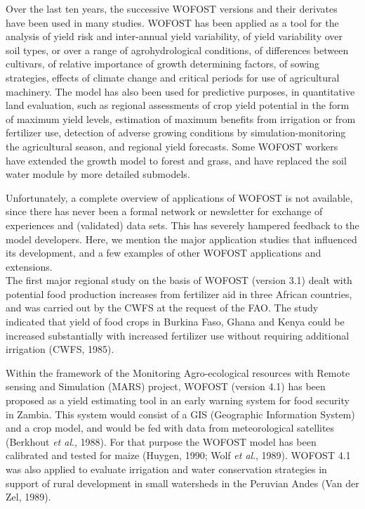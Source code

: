 \documentclass[11pt]{article}
\begin{document}
Over the last ten years, the successive WOFOST versions and their derivates have been
used in many studies. WOFOST has been applied as a tool for the analysis of yield risk
and inter-annual yield variability, of yield variability over soil types, or over a range of
agrohydrological conditions, of differences between cultivars, of relative importance of
growth determining factors, of sowing strategies, effects of climate change and critical
periods for use of agricultural machinery. The model has also been used for predictive
pur\-poses, in quantitative land evaluation, such as regional assessments of crop yield
potential in the form of maximum yield levels, estimation of maximum benefits from
irrigation or from fertilizer use, detection of adverse growing condi\-tions by simulation-monitoring the agricultural season, and regional yield forecasts. Some WOFOST workers
have extended the growth model to forest and grass, and have replaced the soil water
module by more detailed submodels.

Unfortunately, a complete overview of applications of WOFOST is not available, since
there has never been a formal network or newsletter for exchange of experiences and
(validat\-ed) data sets. This has severely hampered feedback to the model devel\-opers. Here,
we mention the major application studies that influenced its development, and a few
examples of other WOFOST applications and extensions.\\
 The first major regional study on the basis of WOFOST (version 3.1) dealt with potential
food production increases from fertilizer aid in three African countries, and was carried
out by the CWFS at the request of the FAO. The study indicated that yield of food crops
in Burkina Faso, Ghana and Kenya could be increased substantially with increased
fertilizer use without requiring additional irrigation (CWFS, 1985).

\bigskip
Within the framework of the Monitoring Agro-ecological {\nobreak}resources with Remote sensing
and Simulation (MARS) project, WOFOST (version 4.1) has been proposed as a yield
estimating tool in an early warning system for food security in Zambia. This system
would consist of a GIS (Geographic Information System) and a crop model, and would be
fed with data from meteorological satellites (Berkhout {\it et al\/}., 1988). For that purpose the
WOFOST model has been calibrated and tested for maize (Huygen, 1990; Wolf {\it et al\/}.,
1989). WOFOST 4.1 was also applied to evaluate irrigation and water conservation strat\-egies in support of rural development in small watersheds in the Peruvian Andes (Van der
Zel, 1989).
\end{document}
